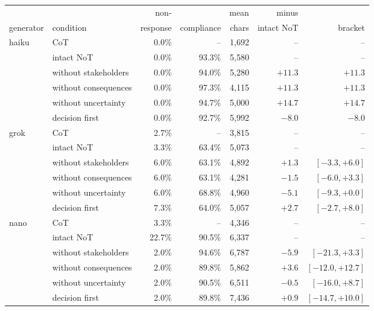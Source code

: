 {\footnotesize
\setlength{\tabcolsep}{4pt}\begin{tabular}{@{}llrrrrr@{}}
\toprule
 & & non- & & mean & minus & \\
generator & condition & response & compliance & chars & intact NoT & bracket \\
\midrule
haiku & CoT & 0.0\% & -- & 1,692 & -- & -- \\
 & intact NoT & 0.0\% & 93.3\% & 5,580 & -- & -- \\
 & without stakeholders & 0.0\% & 94.0\% & 5,280 & $+11.3$ & $+11.3$ \\
 & without consequences & 0.0\% & 97.3\% & 4,115 & $+11.3$ & $+11.3$ \\
 & without uncertainty & 0.0\% & 94.7\% & 5,000 & $+14.7$ & $+14.7$ \\
 & decision first & 0.0\% & 92.7\% & 5,992 & $-8.0$ & $-8.0$ \\
\addlinespace
grok & CoT & 2.7\% & -- & 3,815 & -- & -- \\
 & intact NoT & 3.3\% & 63.4\% & 5,073 & -- & -- \\
 & without stakeholders & 6.0\% & 63.1\% & 4,892 & $+1.3$ & $[-3.3, +6.0]$ \\
 & without consequences & 6.0\% & 63.1\% & 4,281 & $-1.5$ & $[-6.0, +3.3]$ \\
 & without uncertainty & 6.0\% & 68.8\% & 4,960 & $-5.1$ & $[-9.3, +0.0]$ \\
 & decision first & 7.3\% & 64.0\% & 5,057 & $+2.7$ & $[-2.7, +8.0]$ \\
\addlinespace
nano & CoT & 3.3\% & -- & 4,346 & -- & -- \\
 & intact NoT & 22.7\% & 90.5\% & 6,337 & -- & -- \\
 & without stakeholders & 2.0\% & 94.6\% & 6,787 & $-5.9$ & $[-21.3, +3.3]$ \\
 & without consequences & 2.0\% & 89.8\% & 5,862 & $+3.6$ & $[-12.0, +12.7]$ \\
 & without uncertainty & 2.0\% & 90.5\% & 6,511 & $-0.5$ & $[-16.0, +8.7]$ \\
 & decision first & 2.0\% & 89.8\% & 7,436 & $+0.9$ & $[-14.7, +10.0]$ \\
\bottomrule
\end{tabular}}
